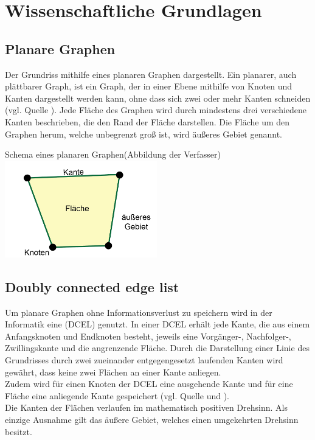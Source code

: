 \chapter{Wissenschaftliche Grundlagen}
\section{Planare Graphen}
Der Grundriss mithilfe eines planaren Graphen dargestellt. 
Ein planarer, auch plättbarer Graph, ist ein Graph, der in einer Ebene mithilfe von Knoten und Kanten dargestellt werden kann, ohne dass sich zwei oder mehr Kanten schneiden (vgl. Quelle \cite{planarGraph}). 
Jede Fläche des Graphen wird durch mindestens drei verschiedene Kanten beschrieben, die den Rand der Fläche darstellen. 
Die Fläche um den Graphen herum, welche unbegrenzt groß ist, wird äußeres Gebiet genannt.
\begin{Bild}{Schema eines planaren Graphen(Abbildung der Verfasser)}
	\includegraphics[width = 250px]{Bilder/planarerGraph-11}
\end{Bild}

\section{Doubly connected edge list}
Um planare Graphen ohne Informationsverlust zu speichern wird in der Informatik eine  (DCEL) genutzt.
In einer DCEL erhält jede Kante, die aus einem Anfangsknoten und Endknoten besteht, jeweils eine Vorgänger-, Nachfolger-, Zwillingskante und die angrenzende Fläche. 
Durch die Darstellung einer Linie des Grundrisses durch zwei zueinander entgegengesetzt laufenden Kanten wird gewährt, dass keine zwei Flächen an einer Kante anliegen.\\
Zudem wird für einen Knoten der DCEL eine ausgehende Kante und für eine Fläche eine anliegende Kante gespeichert (vgl. Quelle \cite{dcel} und \cite{dcelwiki}). \\
Die Kanten der Flächen verlaufen im mathematisch positiven Drehsinn.
Als einzige Ausnahme gilt das äußere Gebiet, welches einen umgekehrten Drehsinn besitzt.

